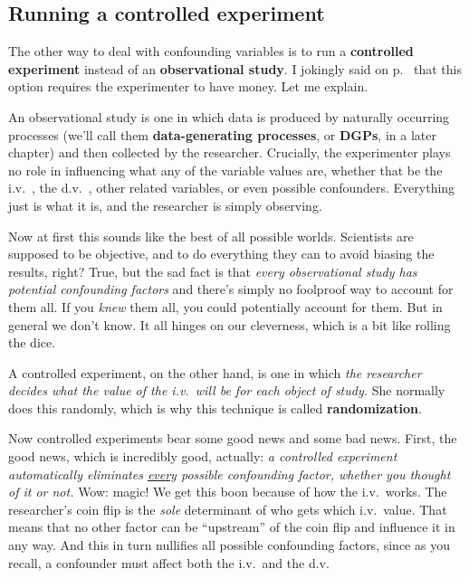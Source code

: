 \subsection{Running a controlled experiment}


The other way to deal with confounding variables is to run a \textbf{controlled
experiment} instead of an \textbf{observational study}. I jokingly said on
p.~\pageref{smart} that this option requires the experimenter to have money.
Let me explain.

An observational study is one in which data is produced by naturally occurring
processes (we'll call them \textbf{data-generating processes}, or
\textbf{DGPs}, in a later chapter) and then collected by the researcher.
Crucially, the experimenter plays no role in influencing what any of the
variable values are, whether that be the i.v.~, the d.v.~, other related
variables, or even possible confounders. Everything just is what it is, and the
researcher is simply observing.

Now at first this sounds like the best of all possible worlds. Scientists are
supposed to be objective, and to do everything they can to avoid biasing the
results, right? True, but the sad fact is that \textit{every observational
study has potential confounding factors} and there's simply no foolproof way to
account for them all. If you \textit{knew} them all, you could potentially
account for them. But in general we don't know. It all hinges on our
cleverness, which is a bit like rolling the dice.


A controlled experiment, on the other hand, is one in which \textit{the
researcher decides what the value of the i.v.~will be for each object of
study.} She normally does this randomly, which is why this technique is called
\textbf{randomization}.

Now controlled experiments bear some good news and some bad news. First, the
good news, which is incredibly good, actually: \textit{a controlled experiment
automatically eliminates \underline{every} possible confounding factor, whether
you thought of it or not.} Wow: magic! We get this boon because of how the
i.v.~works. The researcher's coin flip is the \textit{sole} determinant of who
gets which i.v.~value. That means that no other factor can be ``upstream'' of
the coin flip and influence it in any way. And this in turn nullifies all
possible confounding factors, since as you recall, a confounder must affect
both the i.v.~and the d.v.

